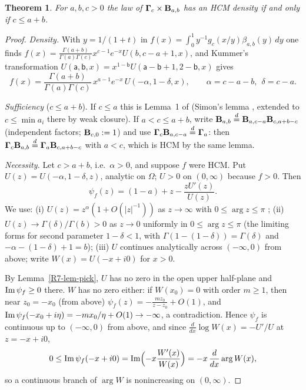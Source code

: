 \documentclass[11pt]{amsart}
\newtheorem{theorem}{Theorem}[section]
\theoremstyle{definition}
\theoremstyle{remark}
\begin{document}
\begin{theorem}\label{R7-thm-gammabeta}
For $a,b,c>0$ the law of $\boldsymbol{\Gamma}_c\times\mathbf{B}_{a,b}$ has an HCM density
if and only if $c\le a+b$.
\end{theorem}

\begin{proof}
\emph{Density.} With $y=1/(1+t)$ in
$f(x)=\int_0^1y^{-1}g_c(x/y)\beta_{a,b}(y)\,dy$ one finds
$f(x)=\frac{\Gamma(a+b)}{\Gamma(a)\Gamma(c)}x^{c-1}e^{-x}U(b,c-a+1,x)$, and
Kummer's transformation $U(\mathsf a,\mathsf b,x)=x^{1-\mathsf b}U(\mathsf a-\mathsf b+1,2-\mathsf b,x)$
\cite[13.2.40]{R7-DLMF} gives
\[
 f(x)=\frac{\Gamma(a+b)}{\Gamma(a)\Gamma(c)}\,x^{a-1}e^{-x}\,U(-\alpha,1-\delta,x),
 \qquad \alpha=c-a-b,\ \ \delta=c-a .
\]

\emph{Sufficiency} ($c\le a+b$). If $c\le a$ this is Lemma~1 of
\cite{R7-BoschSimon16} (Simon's lemma \cite{R7-Simon11}, extended to
$c\le\min a_i$ there by weak closure). If $a<c\le a+b$, write
$\mathbf{B}_{a,b}\overset d=\mathbf{B}_{a,c-a}\mathbf{B}_{c,a+b-c}$ (independent factors;
$\mathbf{B}_{c,0}:=1$) and use $\boldsymbol{\Gamma}_c\mathbf{B}_{a,c-a}\overset d=\boldsymbol{\Gamma}_a$:
then $\boldsymbol{\Gamma}_c\mathbf{B}_{a,b}\overset d=\boldsymbol{\Gamma}_a\mathbf{B}_{c,a+b-c}$ with
$a<c$, which is HCM by the same lemma.

\emph{Necessity.} Let $c>a+b$, i.e.\ $\alpha>0$, and suppose $f$ were HCM.
Put $U(z)=U(-\alpha,1-\delta,z)$, analytic on $\Omega$; $U>0$ on $(0,\infty)$
because $f>0$. Then
\[
 \psi_f(z)=(1-a)+z-\frac{zU'(z)}{U(z)} .
\]
We use: (i) $U(z)=z^{\alpha}(1+O(|z|^{-1}))$ as $z\to\infty$ with
$0\le\arg z\le\pi$ \cite[13.2.6, 13.7.3]{R7-DLMF}; (ii) $U(z)\to\Gamma(\delta)/\Gamma(b)>0$ as $z\to0$
uniformly in $0\le\arg z\le\pi$ (the limiting forms
\cite[13.2.20--13.2.22]{R7-DLMF} for second parameter $1-\delta<1$, with
$\Gamma(1-(1-\delta))=\Gamma(\delta)$ and $-\alpha-(1-\delta)+1=b$);
(iii) $U$ continues analytically across $(-\infty,0)$ from above; write
$W(x)=U(-x+i0)$ for $x>0$.

By Lemma~\ref{R7-lem-pick}, $U$ has no zero in the open upper half-plane and
$\operatorname{Im}\psi_f\ge0$ there. $W$ has no zero either: if $W(x_0)=0$ with order
$m\ge1$, then near $z_0=-x_0$ (from above)
$\psi_f(z)=-\frac{mz_0}{z-z_0}+O(1)$, and
$\operatorname{Im}\psi_f(-x_0+i\eta)=-mx_0/\eta+O(1)\to-\infty$, a contradiction. Hence
$\psi_f$ is continuous up to $(-\infty,0)$ from above, and since
$\frac{d}{dx}\log W(x)=-U'/U$ at $z=-x+i0$,
\[
 0\le\operatorname{Im}\psi_f(-x+i0)=\operatorname{Im}\Bigl(-x\frac{W'(x)}{W(x)}\Bigr)=-x\,\frac{d}{dx}\arg W(x),
\]
so a continuous branch of $\arg W$ is nonincreasing on $(0,\infty)$.


\end{proof}
\end{document}
